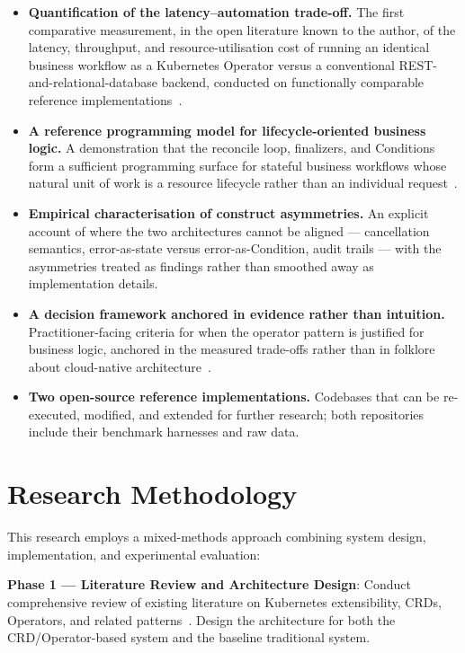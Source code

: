 \begin{itemize}
    \item \textbf{Quantification of the latency--automation trade-off.} The first comparative measurement, in the open literature known to the author, of the latency, throughput, and resource-utilisation cost of running an identical business workflow as a Kubernetes Operator versus a conventional REST-and-relational-database backend, conducted on functionally comparable reference implementations~\cite{kubernetes_multivocal_review, etcd_impact}.

    \item \textbf{A reference programming model for lifecycle-oriented business logic.} A demonstration that the reconcile loop, finalizers, and Conditions form a sufficient programming surface for stateful business workflows whose natural unit of work is a resource lifecycle rather than an individual request~\cite{ibryam2020, dobies2020}.

    \item \textbf{Empirical characterisation of construct asymmetries.} An explicit account of where the two architectures cannot be aligned --- cancellation semantics, error-as-state versus error-as-Condition, audit trails --- with the asymmetries treated as findings rather than smoothed away as implementation details.

    \item \textbf{A decision framework anchored in evidence rather than intuition.} Practitioner-facing criteria for when the operator pattern is justified for business logic, anchored in the measured trade-offs rather than in folklore about cloud-native architecture~\cite{kubernetes_multivocal_review}.

    \item \textbf{Two open-source reference implementations.} Codebases that can be re-executed, modified, and extended for further research; both repositories include their benchmark harnesses and raw data.
\end{itemize}

\section{Research Methodology}\label{sec:methodology}

This research employs a mixed-methods approach combining system design, implementation, and experimental evaluation:

\textbf{Phase 1 — Literature Review and Architecture Design}: Conduct comprehensive review of existing literature on Kubernetes extensibility, CRDs, Operators, and related patterns~\cite{luksa2017, dobies2020, hausenblas2019}. Design the architecture for both the CRD/Operator-based system and the baseline traditional system.

